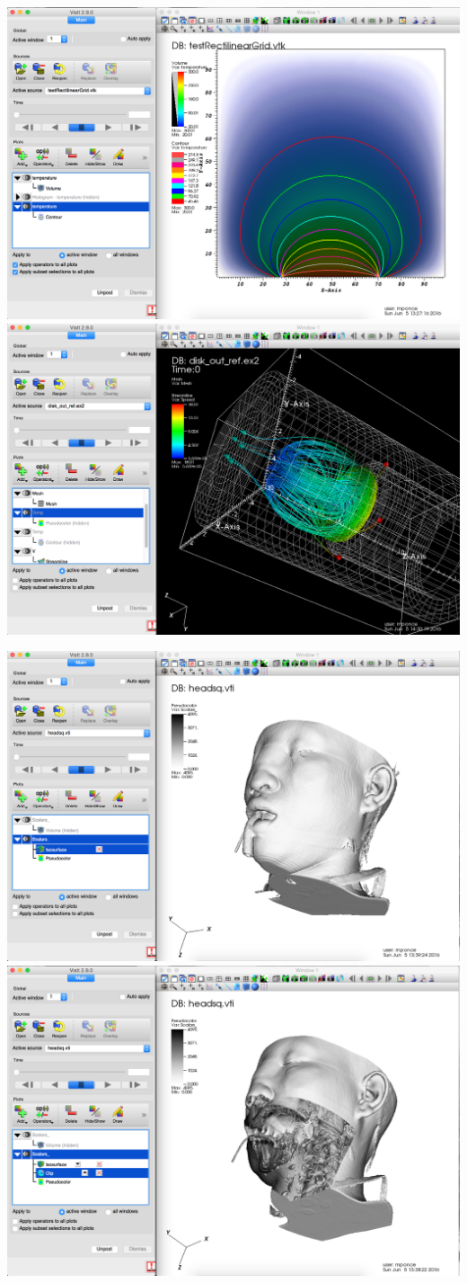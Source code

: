 \begin{frame}
\begin{columns}
\begin{column}{13cm}
	\includegraphics[width=.5\columnwidth]{figs/visit-handson/testRectilinearGrid_gui}
	\includegraphics[width=.5\columnwidth]{figs/visit-handson/disk_out_ref-gui}

	\includegraphics[width=.5\columnwidth]{figs/visit-handson/headsq_gui}
	\includegraphics[width=.5\columnwidth]{figs/visit-handson/headsq-cut_gui}
\end{column}
\end{columns}
\end{frame}
\resetEnv
\basicEnv
